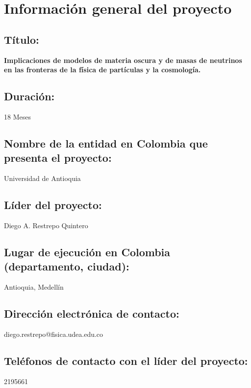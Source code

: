 
\section{Información general del proyecto}
\subsection{Título:}
\textbf{Implicaciones de modelos de materia oscura y de masas de neutrinos en las fronteras de la física de partículas y la cosmología.}
\subsection{Duración: }
18 Meses
\subsection{Nombre de la entidad en Colombia que presenta el proyecto:}
Universidad de Antioquia
\subsection{Líder del proyecto: }
Diego A. Restrepo Quintero
\subsection{Lugar de ejecución en Colombia (departamento, ciudad): }
Antioquia, Medellín
\subsection{Dirección electrónica de contacto:}
diego.restrepo@fisica.udea.edu.co
\subsection{Teléfonos de contacto con el líder del proyecto: }
2195661


